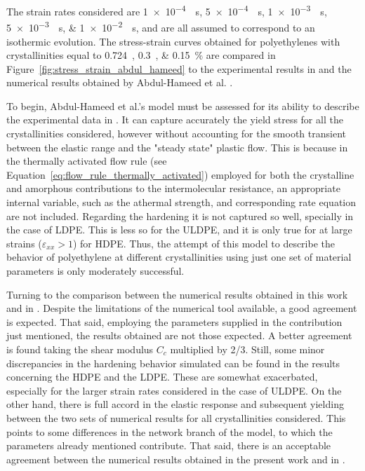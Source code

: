 The strain rates considered are \SIlist{1e-4;5e-4;1e-3;5e-3;1e-2}{\per\second}, and are all assumed to correspond to an isothermic evolution.
The stress-strain curves obtained for polyethylenes with crystallinities equal to \SIlist{0.724;0.3;0.15}{}\% are compared in Figure~\ref{fig:stress_strain_abdul_hameed} to the experimental results in \cite{ayoubEffectsCrystalContent2011} and the numerical results obtained by Abdul-Hameed et al. \citep{abdul-hameedTwophaseHyperelasticviscoplasticConstitutive2014}.

To begin, Abdul-Hameed et al.'s model \citep{abdul-hameedTwophaseHyperelasticviscoplasticConstitutive2014} must be assessed for its ability to describe the experimental data in \cite{ayoubEffectsCrystalContent2011}.
It can capture accurately the yield stress for all the crystallinities considered, however without accounting for the smooth transient between the elastic range and the "steady state" plastic flow.
This is because in the thermally activated flow rule (see Equation~\eqref{eq:flow_rule_thermally_activated}) employed for both the crystalline and amorphous contributions to the intermolecular resistance, an appropriate internal variable, such as the athermal strength, and corresponding rate equation are not included.
Regarding the hardening it is not captured so well, specially in the case of LDPE.
This is less so for the ULDPE, and it is only true for at large strains ($\varepsilon_{xx}>1$) for HDPE.
Thus, the attempt of this model to describe the behavior of polyethylene at different crystallinities using just one set of material parameters is only moderately successful.

Turning to the comparison between the numerical results obtained in this work and in \cite{abdul-hameedTwophaseHyperelasticviscoplasticConstitutive2014}.
Despite the limitations of the numerical tool available, a good agreement is expected.
That said, employing the parameters supplied in the contribution just mentioned, the results obtained are not those expected.
A better agreement is found taking the shear modulus $C_c$ multiplied by 2/3.
Still, some minor discrepancies in the hardening behavior simulated can be found in the results concerning the HDPE and the LDPE.
These are somewhat exacerbated, especially for the larger strain rates considered in the case of ULDPE.
On the other hand, there is full accord in the elastic response and subsequent yielding between the two sets of numerical results for all crystallinities considered.
This points to some differences in the network branch of the model, to which the parameters already mentioned contribute.
That said, there is an acceptable agreement between the numerical results obtained in the present work and in \cite{abdul-hameedTwophaseHyperelasticviscoplasticConstitutive2014}.

